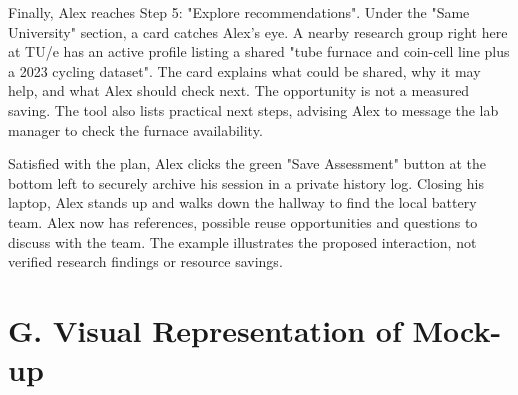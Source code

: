 \documentclass[11pt,a4paper]{article}
\begin{document}
Finally, Alex reaches Step 5: "Explore recommendations". Under the "Same University" section, a card catches Alex's eye. A nearby research group right here at TU/e has an active profile listing a shared "tube furnace and coin-cell line plus a 2023 cycling dataset". The card explains what could be shared, why it may help, and what Alex should check next. The opportunity is not a measured saving. The tool also lists practical next steps, advising Alex to message the lab manager to check the furnace availability.

Satisfied with the plan, Alex clicks the green "Save Assessment" button at the bottom left to securely archive his session in a private history log. Closing his laptop, Alex stands up and walks down the hallway to find the local battery team. Alex now has references, possible reuse opportunities and questions to discuss with the team. The example illustrates the proposed interaction, not verified research findings or resource savings.



\clearpage
\section*{G. Visual Representation of Mock-up}
\end{document}

